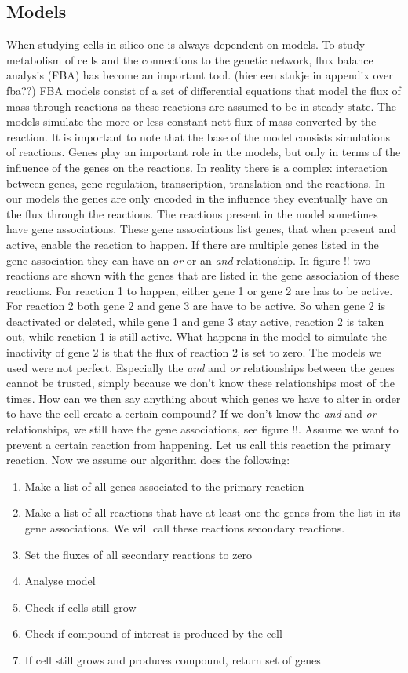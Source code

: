 \documentclass[10pt]{report}
\begin{document}
\subsection{Models}\label{sec:intro_models}
When studying cells in silico one is always dependent on models. To study metabolism of cells and the connections to the genetic network, flux balance analysis (FBA) has become an important tool. (hier een stukje in appendix over fba??)
FBA models consist of a set of differential equations that model the flux of mass through reactions as these reactions are assumed to be in steady state. The models simulate the more or less constant nett flux of mass converted by the reaction.
It is important to note that the base of the model consists simulations of reactions.
Genes play an important role in the models, but only in terms of the influence of the genes on the reactions.
In reality there is a complex interaction between genes, gene regulation, transcription, translation and the reactions.
In our models the genes are only encoded in the influence they eventually have on the flux through the reactions.
The reactions present in the model sometimes have gene associations.
These gene associations list genes, that when present and active, enable the reaction to happen.
If there are multiple genes listed in the gene association they can have an \emph{or} or an \emph{and} relationship.
In figure !! two reactions are shown with the genes that are listed in the gene association of these reactions.
For reaction 1 to happen, either gene 1 or gene 2 are has to be active. For reaction 2 both gene 2 and gene 3 are have to be active. So when gene 2 is deactivated or deleted, while gene 1 and gene 3 stay active, reaction 2 is taken out, while reaction 1 is still active. What happens in the model to simulate the inactivity of gene 2 is that the flux of reaction 2 is set to zero.
The models we used were not perfect. Especially the \emph{and} and \emph{or} relationships between the genes cannot be trusted, simply because we don't know these relationships most of the times.
How can we then say anything about which genes we have to alter in order to have the cell create a certain compound?
If we don't know the \emph{and} and \emph{or} relationships, we still have the gene associations, see figure !!.
Assume we want to prevent a certain reaction from happening. Let us call this reaction the primary reaction. Now we assume our algorithm does the following:
\begin{enumerate}
\item Make a list of all genes associated to the primary reaction
\item Make a list of all reactions that have at least one the genes from the list in its gene associations. We will call these reactions secondary reactions.
\item Set the fluxes of all secondary reactions to zero
\item Analyse model
\item Check if cells still grow
\item Check if compound of interest is produced by the cell
\item If cell still grows and produces compound, return set of genes
\end{enumerate}
\end{document}

